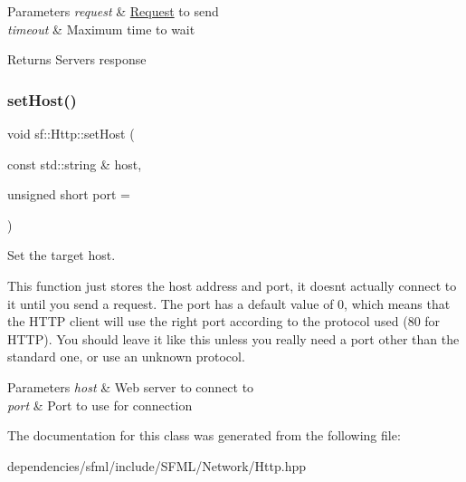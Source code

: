 \begin{DoxyParams}{Parameters}
{\em request} & \hyperlink{classsf_1_1_http_1_1_request}{Request} to send \\
\hline
{\em timeout} & Maximum time to wait\\
\hline
\end{DoxyParams}
\begin{DoxyReturn}{Returns}
Server\textquotesingle{}s response 
\end{DoxyReturn}
\mbox{\label{classsf_1_1_http_a55121d543b61c41cf20b885a97b04e65}} 
\subsubsection{\texorpdfstring{set\+Host()}{setHost()}}
{\footnotesize\ttfamily void sf\+::\+Http\+::set\+Host (\begin{DoxyParamCaption}\item[{const std\+::string \&}]{host,  }\item[{unsigned short}]{port = {} }\end{DoxyParamCaption})}



Set the target host. 

This function just stores the host address and port, it doesn\textquotesingle{}t actually connect to it until you send a request. The port has a default value of 0, which means that the H\+T\+TP client will use the right port according to the protocol used (80 for H\+T\+TP). You should leave it like this unless you really need a port other than the standard one, or use an unknown protocol.


\begin{DoxyParams}{Parameters}
{\em host} & Web server to connect to \\
\hline
{\em port} & Port to use for connection \\
\hline
\end{DoxyParams}


The documentation for this class was generated from the following file\+:\begin{DoxyCompactItemize}
\item 
dependencies/sfml/include/\+S\+F\+M\+L/\+Network/Http.\+hpp\end{DoxyCompactItemize}
